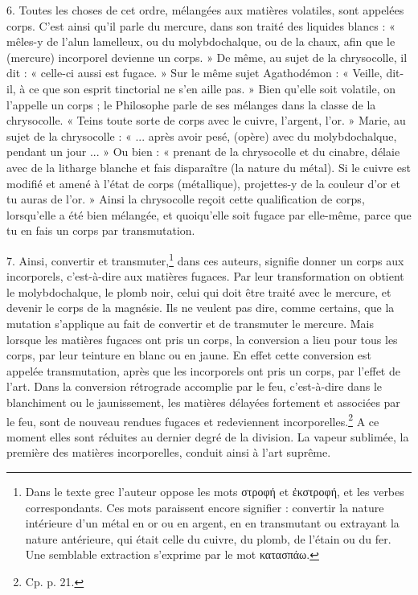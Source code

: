 \documentclass[a4paper, 11pt, oneside, polutonikogreek, french]{article}
\begin{document}
6. Toutes les choses de cet ordre, mélangées aux matières volatiles, sont appelées corps. C'est ainsi qu'il parle du mercure, dans son traité des liquides blancs : « mêles-y de l'alun lamelleux, ou du molybdochalque, ou de la chaux, afin que le (mercure) incorporel devienne un corps. » De même, au sujet de la chrysocolle, il dit : « celle-ci aussi est fugace. » Sur le même sujet Agathodémon : « Veille, dit-il, à ce que son esprit tinctorial ne s'en aille pas. » Bien qu'elle soit volatile, on l'appelle un corps ; le Philosophe parle de ses mélanges dans la classe de la chrysocolle. « Teins toute sorte de corps avec le cuivre, l'argent, l'or. » Marie, au sujet de la chrysocolle : « ... après avoir pesé, (opère) avec du molybdochalque, pendant un jour ... » Ou bien : « prenant de la chrysocolle et du cinabre, délaie avec de la litharge blanche et fais disparaître (la nature du métal). Si le cuivre est modifié et amené à l'état de corps (métallique), projettes-y de la couleur d'or et tu auras de l'or. » Ainsi la chrysocolle reçoit cette qualification de corps, lorsqu'elle a été bien mélangée, et quoiqu'elle soit fugace par elle-même, parce que tu en fais un corps par transmutation.

7. Ainsi, convertir et transmuter,\footnote{Dans le texte grec l'auteur oppose les mots στροφή et ἐκστροφή, et les verbes correspondants. Ces mots paraissent encore signifier : convertir la nature intérieure d'un métal en or ou en argent, en en transmutant ou extrayant la nature antérieure, qui était celle du cuivre, du plomb, de l'étain ou du fer. Une semblable extraction s'exprime par le mot κατασπάω.} dans ces auteurs, signifie donner un corps aux incorporels, c'est-à-dire aux matières fugaces. Par leur transformation on obtient le molybdochalque, le plomb noir, celui qui doit être traité avec le mercure, et devenir le corps de la magnésie. Ils ne veulent pas dire, comme certains, que la mutation s'applique au fait de convertir et de transmuter le mercure. Mais lorsque les matières fugaces ont pris un corps, la conversion a lieu pour tous les corps, par leur teinture en blanc ou en jaune. En effet cette conversion est appelée transmutation, après que les incorporels ont pris un corps, par l'effet de l'art. Dans la conversion rétrograde accomplie par le feu, c'est-à-dire dans le blanchiment ou le jaunissement, les matières délayées fortement et associées par le feu, sont de nouveau rendues fugaces et redeviennent incorporelles.\footnote{Cp. p. 21.} A ce moment elles sont réduites au dernier degré de la division. La vapeur sublimée, la première des matières incorporelles, conduit ainsi à l'art suprême.
\end{document}
